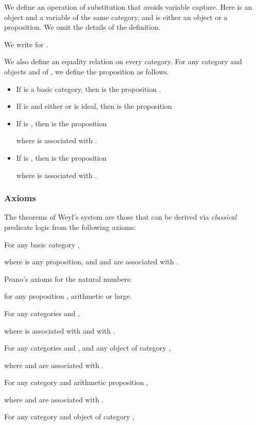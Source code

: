 \documentclass[acmtocl]{acmtrans2m}
\begin{document}
We define an operation of substitution  that avoids variable capture.  Here  is an object and  a variable of the same category, and  is either an object or a proposition.  We omit the details of the definition.

We write  for .

\pagebreak

We also define an equality relation on every category.  For any category  and objects  and  of , we define the proposition  as follows.
\begin{itemize}
 \item If  is a basic category, then  is the proposition .
\item If  is  and either  or  is ideal, then  is the proposition

\item If  is , then  is the proposition

where  is associated with .
\item If  is , then  is the proposition

where  is associated with .
\end{itemize}

\subsubsection{Axioms}
The theorems of Weyl's system are those that can be derived via \emph{classical} predicate logic from the following axioms:
\begin{longenum}
\item For any basic category ,

where  is any proposition, and  and  are associated with .
\item
Peano's axioms for the natural numbers:

for any proposition , arithmetic or large.
\item
For any categories  and ,

where  is associated with  and  with .
\item
For any categories  and , and any object  of category ,

where  and  are associated with .
\item
For any category  and arithmetic proposition ,

where  and  are associated with .
\item For any category  and object  of category ,

\end{longenum}
\end{document}
